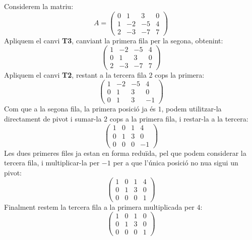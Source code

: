 \begin{exemple}
	Considerem la matriu:
	$$
	A=\begin{pmatrix}
	0 & 1 & 3 & 0 \\  1 & -2 & -5 & 4\\ 2 & -3 & -7 & 7
	\end{pmatrix}
	$$
	Apliquem el canvi \textbf{T3}, canviant la primera fila per la segona, obtenint:
	$$
	\begin{pmatrix}
	1 & -2 & -5 & 4\\0 & 1 & 3 & 0 \\   2 & -3 & -7 & 7
	\end{pmatrix}
	$$
	Apliquem el canvi \textbf{T2}, restant a la tercera fila $2$ cops la primera:
	$$
	\begin{pmatrix}
	1 & -2 & -5 & 4\\0 & 1 & 3 & 0 \\   0 & 1 & 3 & -1
	\end{pmatrix}
	$$
	Com que a la segona fila, la primera posició ja és $1$, podem utilitzar-la directament de pivot i sumar-la $2$ cops a la primera fila, i restar-la a la tercera:
	$$
	\begin{pmatrix}
	1 & 0 & 1 & 4\\0 & 1 & 3 & 0 \\   0 & 0 & 0 & -1
	\end{pmatrix}
	$$
	Les dues primeres files ja estan en forma reduïda, pel que podem considerar la tercera fila, i multiplicar-la per $-1$ per a que l'única posició no nu{\lgem}a sigui un pivot:
	$$
	\begin{pmatrix}
	1 & 0 & 1 & 4\\0 & 1 & 3 & 0 \\   0 & 0 & 0 & 1
	\end{pmatrix}
	$$
	Finalment restem la tercera fila a la primera multiplicada per $4$:
	$$
	\begin{pmatrix}
	1 & 0 & 1 & 0\\0 & 1 & 3 & 0 \\   0 & 0 & 0 & 1
	\end{pmatrix}
	$$
\end{exemple}

